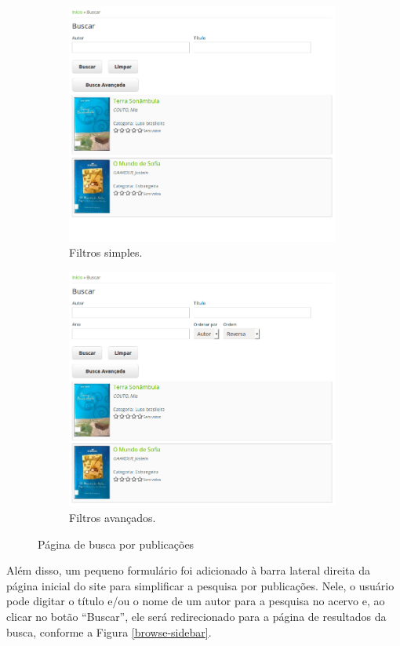 \documentclass[a4paper]{article}
\begin{document}
\begin{figure}
\begin{subfigure}{.5\textwidth}
  \includegraphics[width=90mm]{img/browse-simple.png}
  \caption{Filtros simples.}
  \label{simple}
\end{subfigure}%
\begin{subfigure}{.5\textwidth}
  \includegraphics[width=90mm]{img/browse-advanced.png}
  \caption{Filtros avançados.}
  \label{advanced}
\end{subfigure}
\caption{Página de busca por publicações}
\label{fig:publication-search}
\end{figure}

Além disso, um pequeno formulário foi adicionado à barra lateral direita da página inicial do site para simplificar a pesquisa por publicações. Nele, o usuário pode digitar o título e/ou o nome de um autor para a pesquisa no acervo e, ao clicar no botão “Buscar”, ele será redirecionado para a página de resultados da busca, conforme a Figura \ref{browse-sidebar}.
\end{document}
